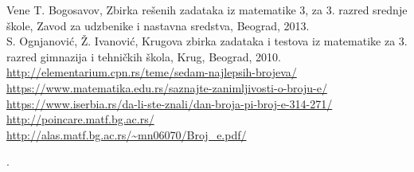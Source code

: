 \documentclass{article}
\begin{document}
\begin{thebibliography}{7}
 Vene T. Bogosavov, Zbirka rešenih zadataka iz matematike 3, za 3. razred srednje škole, Zavod za udzbenike i nastavna sredstva, Beograd, 2013.\\
 S. Ognjanović, Ž. Ivanović, Krugova zbirka zadataka i testova iz matematike za 3. razred gimnazija i tehničkih škola, Krug, Beograd, 2010.\\
\url{ http://elementarium.cpn.rs/teme/sedam-najlepsih-brojeva/} \\
\url{https://www.matematika.edu.rs/saznajte-zanimljivosti-o-broju-e/}\\
\url{https://www.iserbia.rs/da-li-ste-znali/dan-broja-pi-broj-e-314-271/}\\
\url{http://poincare.matf.bg.ac.rs/}\\
\url{http://alas.matf.bg.ac.rs/~mn06070/Broj_e.pdf/}
\end{thebibliography}.
\end{document}

